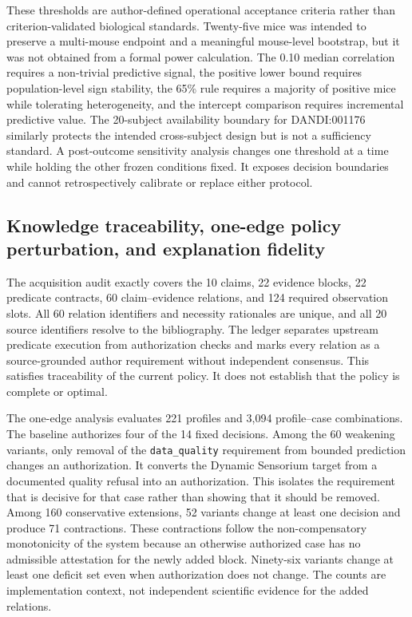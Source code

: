 These thresholds are author-defined operational acceptance criteria rather than criterion-validated biological standards. Twenty-five mice was intended to preserve a multi-mouse endpoint and a meaningful mouse-level bootstrap, but it was not obtained from a formal power calculation. The 0.10 median correlation requires a non-trivial predictive signal, the positive lower bound requires population-level sign stability, the 65\% rule requires a majority of positive mice while tolerating heterogeneity, and the intercept comparison requires incremental predictive value. The 20-subject availability boundary for DANDI:001176 similarly protects the intended cross-subject design but is not a sufficiency standard. A post-outcome sensitivity analysis changes one threshold at a time while holding the other frozen conditions fixed. It exposes decision boundaries and cannot retrospectively calibrate or replace either protocol.

\subsection{Knowledge traceability, one-edge policy perturbation, and explanation fidelity}
\label{subsec:construct-validity-results}

The acquisition audit exactly covers the 10 claims, 22 evidence blocks, 22 predicate contracts, 60 claim--evidence relations, and 124 required observation slots. All 60 relation identifiers and necessity rationales are unique, and all 20 source identifiers resolve to the bibliography. The ledger separates upstream predicate execution from authorization checks and marks every relation as a source-grounded author requirement without independent consensus. This satisfies traceability of the current policy. It does not establish that the policy is complete or optimal.

The one-edge analysis evaluates 221 profiles and 3,094 profile--case combinations. The baseline authorizes four of the 14 fixed decisions. Among the 60 weakening variants, only removal of the \texttt{data\_quality} requirement from bounded prediction changes an authorization. It converts the Dynamic Sensorium target from a documented quality refusal into an authorization. This isolates the requirement that is decisive for that case rather than showing that it should be removed. Among 160 conservative extensions, 52 variants change at least one decision and produce 71 contractions. These contractions follow the non-compensatory monotonicity of the system because an otherwise authorized case has no admissible attestation for the newly added block. Ninety-six variants change at least one deficit set even when authorization does not change. The counts are implementation context, not independent scientific evidence for the added relations.

